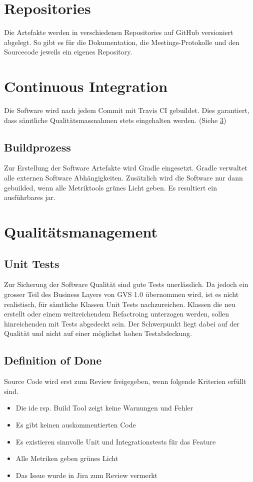 \documentclass[11pt,a4paper,english,oneside]{book}
\numberwithin{equation}{chapter}
\begin{document}
	\section{Repositories}
	Die Artefakte werden in verschiedenen Repositories auf GitHub versioniert abgelegt. So gibt es für die Dokumentation, die Meetings-Protokolle und den Sourcecode jeweils ein eigenes Repository.
	
	\section{Continuous Integration}
	Die Software wird nach jedem Commit mit Travis CI \cite{travisci} gebuildet. Dies garantiert, dass sämtliche Qualitätsmassnahmen stets eingehalten werden. (Siehe \ref{sec:qualitymeasures})
	
	\subsection{Buildprozess}
	\label{sec:buildprocess}
	Zur Erstellung der Software Artefakte wird Gradle \cite{gradle} eingesetzt. Gradle verwaltet alle externen Software Abhängigkeiten. Zusätzlich wird die Software nur dann gebuilded, wenn alle Metriktools grünes Licht geben. Es resultiert ein ausführbares \gls{jar}.
	
	\section{Qualitätsmanagement}
	\label{sec:qualitymeasures}
	
	\subsection{Unit Tests}
	Zur Sicherung der Software Qualität sind gute Tests unerlässlich. Da jedoch ein grosser Teil des Business Layers von GVS 1.0 übernommen wird, ist es nicht realistisch, für sämtliche Klassen Unit Tests nachzureichen. Klassen die neu erstellt oder einem weitreichendem Refactroing unterzogen werden, sollen hinreichenden mit Tests abgedeckt sein. Der Schwerpunkt liegt dabei auf der Qualität und nicht auf einer möglichst hohen Testabdeckung.
	
	\subsection{Definition of Done} \label{ssec:dod}
	Source Code wird erst zum Review freigegeben, wenn folgende Kriterien erfüllt sind.
	\begin{itemize}
		\item Die \gls{ide} rsp. Build Tool zeigt keine Warnungen und Fehler
		\item Es gibt keinen auskommentierten Code
		\item Es existieren sinnvolle Unit und Integrationstests für das Feature
		\item Alle Metriken geben grünes Licht
		\item Das Issue wurde in Jira \cite{jira} zum Review vermerkt
	\end{itemize}
	
\end{document}
